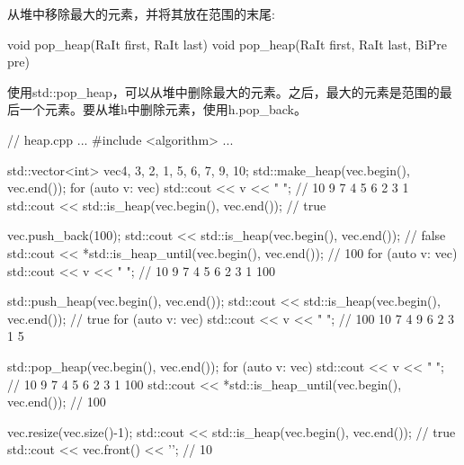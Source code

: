 从堆中移除最大的元素，并将其放在范围的末尾:

\begin{cpp}
void pop_heap(RaIt first, RaIt last)
void pop_heap(RaIt first, RaIt last, BiPre pre)
\end{cpp}

使用std::pop\_heap，可以从堆中删除最大的元素。之后，最大的元素是范围的最后一个元素。要从堆h中删除元素，使用h.pop\_back。


\begin{cpp}
// heap.cpp
...
#include <algorithm>
...

std::vector<int> vec{4, 3, 2, 1, 5, 6, 7, 9, 10};
std::make_heap(vec.begin(), vec.end());
for (auto v: vec) std::cout << v << " "; // 10 9 7 4 5 6 2 3 1
std::cout << std::is_heap(vec.begin(), vec.end()); // true

vec.push_back(100);
std::cout << std::is_heap(vec.begin(), vec.end()); // false
std::cout << *std::is_heap_until(vec.begin(), vec.end()); // 100
for (auto v: vec) std::cout << v << " "; // 10 9 7 4 5 6 2 3 1 100

std::push_heap(vec.begin(), vec.end());
std::cout << std::is_heap(vec.begin(), vec.end()); // true
for (auto v: vec) std::cout << v << " "; // 100 10 7 4 9 6 2 3 1 5

std::pop_heap(vec.begin(), vec.end());
for (auto v: vec) std::cout << v << " "; // 10 9 7 4 5 6 2 3 1 100
std::cout << *std::is_heap_until(vec.begin(), vec.end()); // 100

vec.resize(vec.size()-1);
std::cout << std::is_heap(vec.begin(), vec.end()); // true
std::cout << vec.front() << '\n'; // 10
\end{cpp}













































